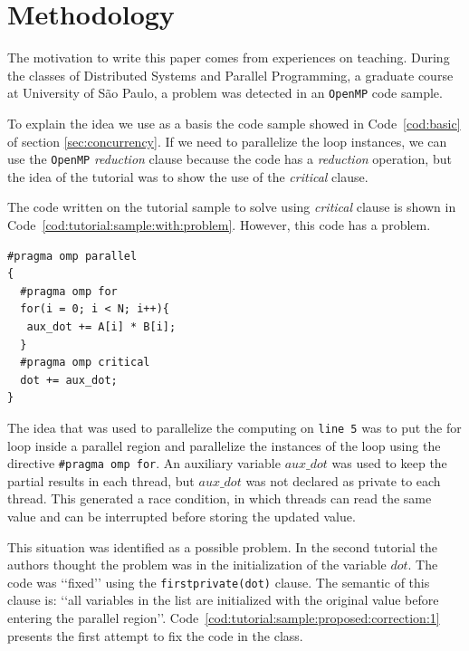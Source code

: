 \section{Methodology}
\label{sec:methodology}


The motivation to write this paper comes from experiences on teaching. During the classes of Distributed Systems and Parallel Programming, a graduate course at University of São Paulo, a problem was detected in an \texttt{OpenMP} code sample.

To explain the idea we use as a basis the code sample showed in Code~\ref{cod:basic} of section \ref{sec:concurrency}. If we need to parallelize the loop instances, we can use the \texttt{OpenMP} \emph{reduction} clause because the code has a \emph{reduction} operation, but the idea of the tutorial was to show the use of the \emph{critical} clause.

The code written on the tutorial sample to solve using \emph{critical} clause is shown in Code~\ref{cod:tutorial:sample:with:problem}. However, this code has a problem. 
 
\begin{lstlisting}[style=C, label=cod:tutorial:sample:with:problem,caption=Code of original OpenMP tutorial with problem.]
#pragma omp parallel
{
  #pragma omp for
  for(i = 0; i < N; i++){
   aux_dot += A[i] * B[i];
  }
  #pragma omp critical
  dot += aux_dot;
}
\end{lstlisting}

The idea that was used to parallelize the computing on \texttt{line 5} was to put the for loop inside a parallel region and parallelize the instances of the loop using the directive \texttt{\#pragma omp for}. An auxiliary variable $aux\_dot$ was used to keep the partial results in each thread, but $aux\_dot$ was not declared as private to each thread. This generated a race condition, in which threads can read the same value and can be interrupted before storing the updated value.

This situation was identified as a possible problem. In the second tutorial the authors thought the problem was in the initialization of the variable $dot$. The code was \lq\lq{}fixed\rq\rq{} using the \texttt{firstprivate(dot)} clause. The semantic of this clause is: \lq\lq{}all variables in the list are initialized with the original value before entering the parallel region\rq\rq{}. Code~\ref{cod:tutorial:sample:proposed:correction:1} presents the first attempt to fix the code in the class.
 
